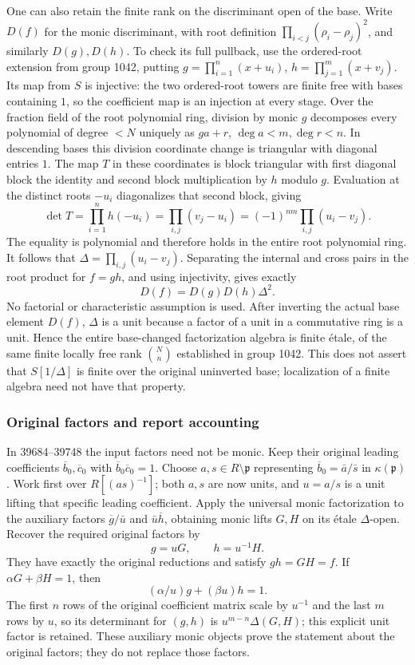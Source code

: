 One can also retain the finite rank on the discriminant open of the base. Write \(D(f)\) for the monic discriminant, with root definition \(\prod_{i<j}(\rho_i-\rho_j)^2\), and similarly \(D(g),D(h)\). To check its full pullback, use the ordered-root extension from group 1042, putting \(g=\prod_{i=1}^n(x+u_i)\), \(h=\prod_{j=1}^m(x+v_j)\). Its map from \(S\) is injective: the two ordered-root towers are finite free with bases containing \(1\), so the coefficient map is an injection at every stage. Over the fraction field of the root polynomial ring, division by monic \(g\) decomposes every polynomial of degree \(<N\) uniquely as \(ga+r\), \(\deg a<m,\deg r<n\). In descending bases this division coordinate change is triangular with diagonal entries \(1\). The map \(T\) in these coordinates is block triangular with first diagonal block the identity and second block multiplication by \(h\) modulo \(g\). Evaluation at the distinct roots \(-u_i\) diagonalizes that second block, giving \[
\det T=\prod_{i=1}^n h(-u_i)
 =\prod_{i,j}(v_j-u_i)=(-1)^{nm}\prod_{i,j}(u_i-v_j).
\] The equality is polynomial and therefore holds in the entire root polynomial ring. It follows that \(\Delta=\prod_{i,j}(u_i-v_j)\). Separating the internal and cross pairs in the root product for \(f=gh\), and using injectivity, gives exactly \[
D(f)=D(g)D(h)\Delta^2.
\] No factorial or characteristic assumption is used. After inverting the actual base element \(D(f)\), \(\Delta\) is a unit because a factor of a unit in a commutative ring is a unit. Hence the entire base-changed factorization algebra is finite étale, of the same finite locally free rank \(\binom{N}{n}\) established in group 1042. This does not assert that \(S[1/\Delta]\) is finite over the original uninverted base; localization of a finite algebra need not have that property.

\subsubsection{Original factors and report accounting}\label{algebra-proof-051-original-factors-and-report-accounting}

In 39684--39748 the input factors need not be monic. Keep their original leading coefficients \(\overline b_0,\overline c_0\) with \(\overline b_0\overline c_0=1\). Choose \(a,s\in R\setminus\mathfrak p\) representing \(\overline b_0=\bar a/\bar s\) in \(\kappa(\mathfrak p)\). Work first over \(R[(as)^{-1}]\); both \(a,s\) are now units, and \(u=a/s\) is a unit lifting that specific leading coefficient. Apply the universal monic factorization to the auxiliary factors \(\overline g/\bar u\) and \(\bar u\overline h\), obtaining monic lifts \(G,H\) on its étale \(\Delta\)-open. Recover the required original factors by \[
g=uG,\qquad h=u^{-1}H.
\] They have exactly the original reductions and satisfy \(gh=GH=f\). If \(\alpha G+\beta H=1\), then \[
(\alpha/u)g+(\beta u)h=1.
\] The first \(n\) rows of the original coefficient matrix scale by \(u^{-1}\) and the last \(m\) rows by \(u\), so its determinant for \((g,h)\) is \(u^{m-n}\Delta(G,H)\); this explicit unit factor is retained. These auxiliary monic objects prove the statement about the original factors; they do not replace those factors.

